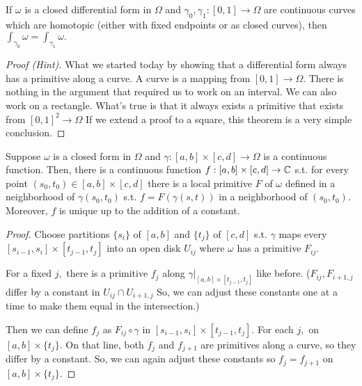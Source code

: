 \documentclass[a4paper,12pt]{article}
\begin{document}
\begin{theorem}
    If $\omega$ is a closed differential form in $\Omega$ and $\gamma_0,\gamma_1:[0,1]\to\Omega$ are continuous curves which are homotopic (either with fixed endpoints or as closed curves), then $\int_{\gamma_0}\omega=\int_{\gamma_1}\omega.$
    \begin{proof}[Proof (Hint)]
        What we started today by showing that a differential form always has a primitive along a curve. A curve is a mapping from $[0,1]\to\Omega.$ There is nothing in the argument that required us to work on an interval. We can also work on a rectangle. What's true is that it always exists a primitive that exists from $[0,1]^2\to\Omega$ If we extend a proof to a square, this theorem is a very simple conclusion.
    \end{proof}

    \begin{lemma}
        Suppose $\omega$ is a closed form in $\Omega$ and $\gamma:[a,b]\times[c,d]\to\Omega$ is a continuous function. Then, there is a continuous function $f:[a,b]\times[c,d]\to\mathbb{C}$ s.t. for every point $(s_0,t_0)\in[a,b]\times[c,d]$ there is a local primitive $F$ of $\omega$ defined in a neighborhood of $\gamma(s_0,t_0)$ s.t. $f=F(\gamma(s,t))$ in a neighborhood of $(s_0,t_0).$ Moreover, $f$ is unique up to the addition of a constant.
        \begin{proof}
            Choose partitions $\{s_i\}$ of $[a,b]$ and $\{t_j\}$ of $[c,d]$ s.t. $\gamma$ maps every $[s_{i-1},s_i]\times[t_{j-1},t_j]$ into an open disk $U_{ij}$ where $\omega$ has a primitive $F_{ij}.$

            For a fixed $j,$ there is a primitive $f_j$ along $\gamma|_{[a,b]\times[t_{j-1},t_j]}$ like before. ($F_{ij},F_{i+1,j}$ differ by a constant in $U_{ij}\cap U_{i+1,j}$ So, we can adjust these constants one at a time to make them equal in the intersection.)

            Then we can define $f_j$ as $F_{ij}\circ\gamma$ in $[s_{i-1},s_i]\times[t_{j-1},t_j].$ For each $j,$ on $[a,b]\times\{t_j\}.$ On that line, both $f_j$ and $f_{j+1}$ are primitives along a curve, so they differ by a constant. So, we can again adjust these constants so $f_j=f_{j+1}$ on $[a,b]\times\{t_j\}.$


\end{proof}
\end{lemma}
\end{theorem}
\end{document}
